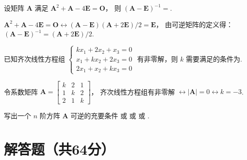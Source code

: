 \begin{problem}
  设矩阵 $\mathbf A$ 满足 $\mathbf A^2 + \mathbf  A - 4\mathbf E = \mathbf O$，
  则 $(\mathbf A - \mathbf E)^{-1} = $.
\end{problem}
\scratch[6ex]
\begin{solution}
  $\mathbf A^2 + \mathbf A - 4\mathbf E = \mathbf O \longleftrightarrow
  (\mathbf A - \mathbf E)(\mathbf A + 2\mathbf E)/2 = \mathbf E$，
  由可逆矩阵的定义得：$(\mathbf A - \mathbf E)^{-1} = (\mathbf A + 2\mathbf E)/2$.
\end{solution}

\begin{problem}
  已知齐次线性方程组
  $\begin{cases}
    kx_1 + 2x_2 + x_3  = 0\\
    x_1  + kx_2 + 2x_3 = 0\\
    2x_1 + x_2  + kx_3 = 0
  \end{cases}$ 有非零解，则 $k$ 需要满足的条件为.
\end{problem}
\scratch[6ex]
\begin{solution}
  令系数矩阵 $\mathbf A =
  \begin{bmatrix}
    k & 2 & 1\\
    1 & k & 2\\
    2 & 1 & k
  \end{bmatrix}$，
  齐次线性方程组有非零解
  $\longleftrightarrow |\mathbf A| = 0 \longleftrightarrow k = -3$.
\end{solution}

\begin{problem}
  写出一个 $n$ 阶方阵 $\mathbf A$ 可逆的充要条件
  或
  或
  或
  .
\end{problem}
\scratch[6ex]

\section{解答题（共64分）}


